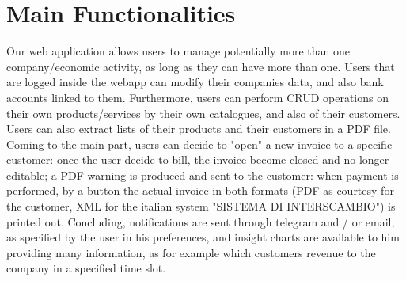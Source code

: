 \section{Main Functionalities}

Our web application allows users to manage potentially more than one company/economic activity, as long as they can have more than one.
Users that are logged inside the webapp can modify their companies data, and also bank accounts linked to them.
Furthermore, users can perform CRUD operations on their own products/services by their own catalogues, and also of their customers. Users can also
extract lists of their products and their customers in a PDF file.
Coming to the main part, users can decide to "open" a new invoice to a specific customer: once the user decide to bill, the invoice become closed
and no longer editable; a PDF warning is produced and sent to the customer: when payment is performed, by a button the actual invoice in both
formats (PDF as courtesy for the customer, XML for the italian system "SISTEMA DI INTERSCAMBIO") is printed out.
Concluding, notifications are sent through telegram and / or email, as specified by the user in his preferences, and insight charts are available to
him providing many information, as for example which customers revenue to the company in a specified time slot.

